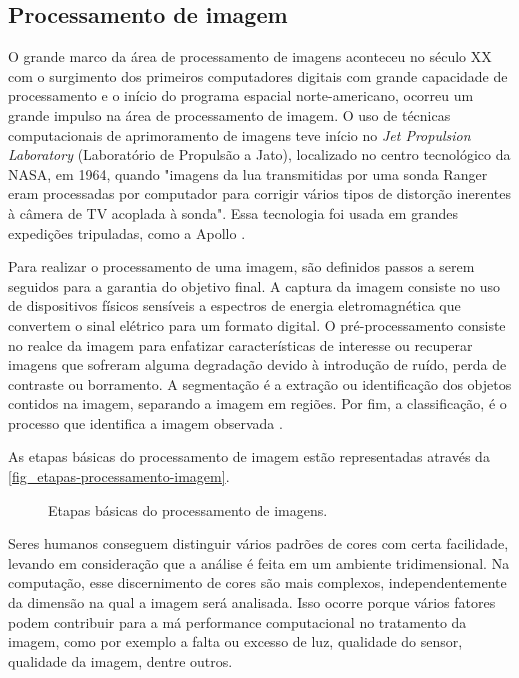 \subsection{Processamento de imagem}

O grande marco da área de processamento de imagens aconteceu no século XX com o surgimento dos primeiros computadores digitais com grande capacidade de processamento e o início do programa espacial norte-americano, ocorreu um grande impulso na área de processamento de imagem. O uso de técnicas computacionais de aprimoramento de imagens teve início no \textit{Jet Propulsion Laboratory} (Laboratório de Propulsão a Jato), localizado no centro tecnológico da NASA, em 1964, quando "imagens da lua transmitidas por uma sonda Ranger eram processadas por computador para corrigir vários tipos de distorção inerentes à câmera de TV acoplada à sonda". Essa tecnologia foi usada em grandes expedições tripuladas, como a Apollo \cite{FILHO1999}.

Para realizar o processamento de uma imagem, são definidos passos a serem seguidos para a garantia do objetivo final. A captura da imagem consiste no uso de dispositivos físicos sensíveis a espectros de energia eletromagnética que convertem o sinal elétrico para um formato digital. O pré-processamento consiste no realce da imagem para enfatizar características de interesse ou recuperar imagens que sofreram alguma degradação devido à introdução de ruído, perda de contraste ou borramento. A segmentação é a extração ou identificação dos objetos contidos na imagem, separando a imagem em regiões. Por fim, a classificação, é o processo que identifica a imagem observada \cite{GONZALEZ2002}.

As etapas básicas do processamento de imagem estão representadas através da \autoref{fig_etapas-processamento-imagem}.

\begin{figure}[h]
	\caption{\label{fig_etapas-processamento-imagem}Etapas básicas do processamento de imagens.}
	\begin{center}
	\end{center}
	\centering {}
\end{figure}

Seres humanos conseguem distinguir vários padrões de cores com certa facilidade, levando em consideração que a análise é feita em um ambiente tridimensional. Na computação, esse discernimento de cores são mais complexos, independentemente da dimensão na qual a imagem será analisada. Isso ocorre porque vários fatores podem contribuir para a má performance computacional no tratamento da imagem, como por exemplo a falta ou excesso de luz, qualidade do sensor, qualidade da imagem, dentre outros.

